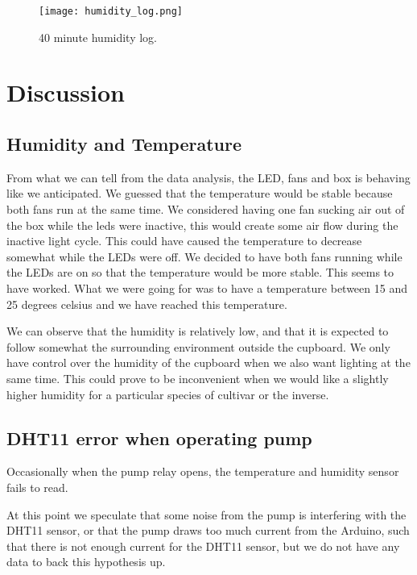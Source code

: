 \documentclass[a4paper,12pt,twoside,openright,titlepage]{book}
\begin{document}
\begin{figure}[h]
    \begin{center}
        \label{humidity_log}
        \texttt{[image: humidity\_log.png]}
        \caption{40 minute humidity log.}
    \end{center}
\end{figure}



\chapter{Discussion}

\section{Humidity and Temperature}
From what we can tell from the data analysis, the LED, fans and box is behaving like we anticipated. We guessed that the temperature would be stable because both fans run at the same time. We considered having one fan sucking air out of the box while the leds were inactive, this would create some air flow during the inactive light cycle. This could have caused the temperature to decrease somewhat while the LEDs were off. We decided to have both fans running while the LEDs are on so that the temperature would be more stable. This seems to have worked. What we were going for was to have a temperature between 15 and 25 degrees celsius and we have reached this temperature.

We can observe that the humidity is relatively low, and that it is expected to follow somewhat the surrounding environment outside the cupboard.
We only have control over the humidity of the cupboard when we also want lighting at the same time. This could prove to be inconvenient when we would like a slightly higher humidity for a particular species of cultivar or the inverse.

\section{DHT11 error when operating pump}
Occasionally when the pump relay opens, the temperature and humidity sensor fails to read.

At this point we speculate that some noise from the pump is interfering with the DHT11 sensor, or that the pump draws too much current from the Arduino, such that there is not enough current for the DHT11 sensor, but we do not have any data to back this hypothesis up.
\end{document}
